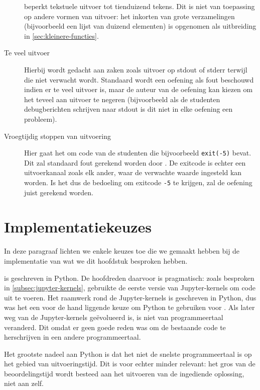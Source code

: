 \begin{description}
    \tested{} beperkt tekstuele uitvoer tot tienduizend tekens.
    Dit is niet van toepassing op andere vormen van uitvoer: het inkorten van grote verzamelingen (bijvoorbeeld een lijst van duizend elementen) is opgenomen als uitbreiding in \cref{sec:kleinere-functies}.
    \item[Te veel uitvoer] Hierbij wordt gedacht aan zaken zoals uitvoer op stdout of stderr terwijl die niet verwacht wordt.
    Standaard wordt een oefening als fout beschouwd indien er te veel uitvoer is, maar de auteur van de oefening kan kiezen om het teveel aan uitvoer te negeren (bijvoorbeeld als de studenten debugberichten schrijven naar stdout is dit niet in elke oefening een probleem).
    \item[Vroegtijdig stoppen van uitvoering] Hier gaat het om code van de studenten die bijvoorbeeld \texttt{exit(-5)} bevat.
    Dit zal standaard fout gerekend worden door \tested{}.
    De exitcode is echter een uitvoerkanaal zoals elk ander, waar de verwachte waarde ingesteld kan worden.
    Is het dus de bedoeling om exitcode \texttt{-5} te krijgen, zal de oefening juist gerekend worden.

\end{description}

\section{Implementatiekeuzes}\label{sec:technische-aspecten}

In deze paragraaf lichten we enkele keuzes toe die we gemaakt hebben bij de implementatie van wat we dit hoofdstuk besproken hebben.

\tested{} is geschreven in Python.
De hoofdreden daarvoor is pragmatisch: zoals besproken in \cref{subsec:jupyter-kernels}, gebruikte de eerste versie van \tested{} Jupyter-kernels om code uit te voeren.
Het raamwerk rond de Jupyter-kernels is geschreven in Python, dus was het een voor de hand liggende keuze om Python te gebruiken voor \tested{}.
Als \tested{} later weg van de Jupyter-kernels geëvolueerd is, is niet van programmeertaal veranderd.
Dit omdat er geen goede reden was om de bestaande code te herschrijven in een andere programmeertaal.

Het grootste nadeel aan Python is dat het niet de snelste programmeertaal is op het gebied van uitvoeringstijd.
Dit is voor \tested{} echter minder relevant: het gros van de beoordelingstijd wordt besteed aan het uitvoeren van de ingediende oplossing, niet aan \tested{} zelf.

